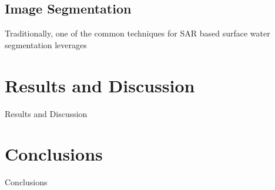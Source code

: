 \documentclass{article}
\begin{document}
\subsection{Image Segmentation}
\label{ssec:image_segmentation}

Traditionally, one of the common techniques for SAR based surface water segmentation leverages 

\section{Results and Discussion}
\label{sec:results_and_discussion}

Results and Discussion


%


\section{Conclusions}
Conclusions
\label{sec:conclusions}

\end{document}
